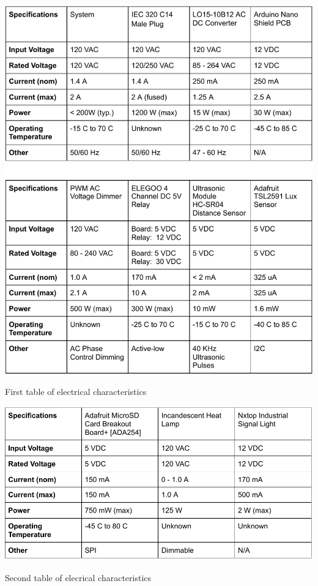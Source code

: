 \documentclass{article}
\begin{document}
\begin{table}[H]
    \centering
    \includegraphics[width=\textwidth]{fig/electrical-chars-1.pdf}
    \caption{First table of electrical characteristics}
    \label{fig:electric-char-1}
\end{table}

\begin{table}[H]
    \centering
    \includegraphics[width=\textwidth]{fig/electrical-chars-2.pdf}
    \caption{Second table of elecrical characteristics}
    \label{fig:electric-char-2}
\end{table}
\end{document}
